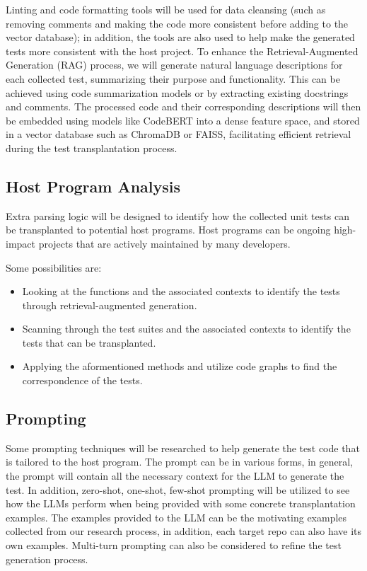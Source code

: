 \documentclass[sigconf]{acmart}
\begin{document}
%
Linting and code formatting tools will be used for data cleansing (such as removing comments and making the code more consistent before adding to the vector database); in addition, the tools are also used to help make the generated tests more consistent with the host project.
%
To enhance the Retrieval-Augmented Generation (RAG) process, we will generate natural language descriptions for each collected test, summarizing their purpose and functionality. This can be achieved using code summarization models or by extracting existing docstrings and comments.
%
The processed code and their corresponding descriptions will then be embedded using models like CodeBERT into a dense feature space, and stored in a vector database such as ChromaDB or FAISS, facilitating efficient retrieval during the test transplantation process.


\subsection{Host Program Analysis}
Extra parsing logic will be designed to identify how the collected unit tests can be transplanted to potential host programs. Host programs can be ongoing high-impact projects that are actively maintained by many developers.

Some possibilities are:
\begin{itemize}
\item Looking at the functions and the associated contexts to identify the tests through retrieval-augmented generation.
\item Scanning through the test suites and the associated contexts to identify the tests that can be transplanted.
\item Applying the aformentioned methods and utilize code graphs to find the correspondence of the tests.
\end{itemize}

\subsection{Prompting}
Some prompting techniques will be researched to help generate the test code that is tailored to the host program.
%
The prompt can be in various forms, in general, the prompt will contain all the necessary context for the LLM to generate the test.
%
In addition, zero-shot, one-shot, few-shot prompting will be utilized to see how the LLMs perform when being provided with some concrete transplantation examples.
%
The examples provided to the LLM can be the motivating examples collected from our research process, in addition, each target repo can also have its own examples.
%
Multi-turn prompting can also be considered to refine the test generation process.
%
\end{document}
